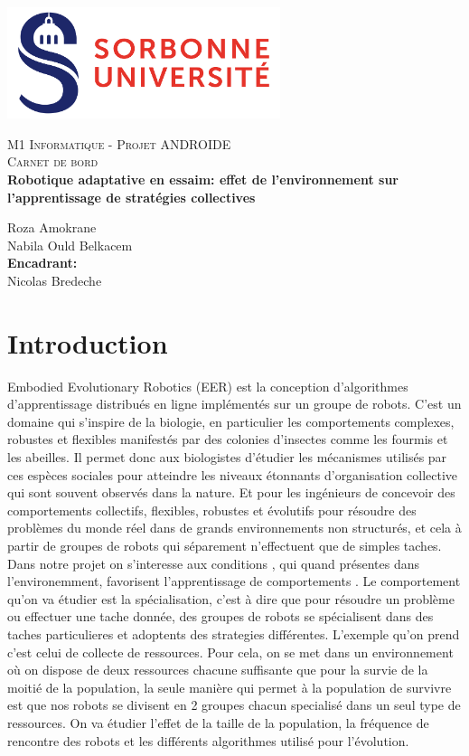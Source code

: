 \documentclass[11pt]{article}
\begin{document}
  \center \includegraphics[width=8cm]{logo.png}

\begin{center}
\textsc{\Large M1 Informatique - Projet ANDROIDE}\\[0.5cm]
\textsc{\Large  Carnet de bord }\\[0.5cm]
\textbf{Robotique adaptative en essaim: effet de l'environnement sur l'apprentissage de stratégies collectives} \\[3cm]
\end{center}


\begin{center}
Roza Amokrane\\[0.3cm]
Nabila Ould Belkacem\\[0.8cm]
\textbf{Encadrant:}\\
Nicolas Bredeche \\[0.4cm]
\end{center}


\newpage
\tableofcontents
\newpage
\justify
\section{Introduction}
Embodied Evolutionary Robotics (EER) est la conception d’algorithmes d'apprentissage distribués en ligne implémentés  sur un groupe de robots. C'est un domaine qui s'inspire de la biologie, en particulier les comportements complexes, robustes et flexibles  manifestés par des colonies d'insectes comme les fourmis et les abeilles. Il permet donc aux biologistes d'étudier les mécanismes utilisés par ces espèces sociales pour atteindre les niveaux étonnants d'organisation collective qui sont souvent observés dans la nature. Et  pour les ingénieurs de concevoir des comportements collectifs, flexibles, robustes et évolutifs pour résoudre des problèmes du monde réel dans de grands environnements non structurés, et cela à partir de groupes de robots qui séparement n'effectuent que de simples taches.
Dans notre projet on s'interesse aux conditions , qui quand présentes dans l'environemment, favorisent l'apprentissage de comportements .  Le comportement qu'on va étudier est la spécialisation, c'est à dire que pour résoudre un problème ou effectuer une tache donnée, des groupes de robots se spécialisent dans des taches particulieres et adoptents des strategies différentes. L'exemple qu'on prend c'est celui de collecte de ressources. Pour cela, on se met dans un environnement où on dispose de deux ressources chacune suffisante que pour la survie de la moitié de la population, la seule manière qui permet à la population de survivre est que nos robots se divisent en 2 groupes chacun specialisé dans un seul type de ressources. On va étudier l'effet de la taille de la population, la fréquence de rencontre des robots et les différents algorithmes utilisé pour l'évolution.
\end{document}
